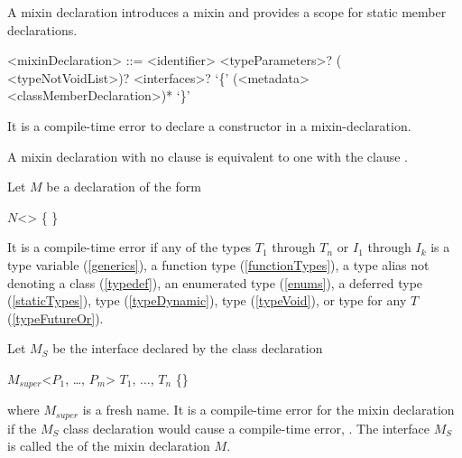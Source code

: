\documentclass[makeidx]{article}
\begin{document}
\LMHash{}%
A mixin declaration introduces a mixin and provides a scope
for static member declarations.

\begin{grammar}
<mixinDeclaration> ::= \MIXIN{} <identifier> <typeParameters>?
  \gnewline{} (\ON{} <typeNotVoidList>)? <interfaces>?
  \gnewline{} `\{' (<metadata> <classMemberDeclaration>)* `\}'
\end{grammar}

\LMHash{}
It is a compile-time error to declare a constructor in a mixin-declaration.

\LMHash{}
A mixin declaration with no \code{\ON{}} clause is equivalent
to one with the clause .

\LMHash{}
Let $M$ be a \MIXIN{} declaration of the form

\begin{normativeDartCode}
\MIXIN{} $N$<\TypeParametersStd> \ON{} 
    \IMPLEMENTS{}  \{
\}
\end{normativeDartCode}

It is a compile-time error if any of the types $T_1$ through $T_n$
or $I_1$ through $I_k$ is
a type variable (\ref{generics}),
a function type (\ref{functionTypes}),
a type alias not denoting a class (\ref{typedef}),
an enumerated type (\ref{enums}),
a deferred type (\ref{staticTypes}),
type \DYNAMIC{} (\ref{typeDynamic}),
type \VOID{} (\ref{typeVoid}),
or type  for any $T$ (\ref{typeFutureOr}).

\LMHash{}%
Let $M_S$ be the interface declared by the class declaration

\begin{normativeDartCode}
\ABSTRACT{} \CLASS{} $M_{super}$<$P_1$, \ldots{}, $P_m$> \IMPLEMENTS{} $T_1$, $\dots{}$, $T_n$ \{\}
\end{normativeDartCode}

where $M_{super}$ is a fresh name.
It is a compile-time error for the mixin declaration if the $M_S$
class declaration would cause a compile-time error,
.
The interface $M_S$ is called the
 of the mixin declaration $M$.
\end{document}
